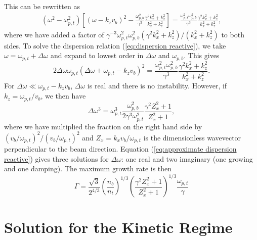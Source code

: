 \documentclass[usenatbib,iop,apj]{emulateapj}
\begin{document}
This can be rewritten as 
\begin{eqnarray}\label{eq:dispersion reactive}
 \left(\omega^2 - \omega_{p,t}^2\right)\left[\left(\omega - k_z v_b\right)^2 - \frac{\omega_{p,b}^2}{\gamma^3}\frac{\gamma^2 k_x^2 + k_z^2}{k_x^2 + k_z^2}\right] = \frac{\omega_{p,t}^2\omega_{p,b}^2}{\gamma^3}\frac{\gamma^2 k_x^2 + k_z^2}{k_x^2 + k_z^2},
\end{eqnarray}
where we have added a factor of $\gamma^{-3}\omega_{p,t}^2\omega_{p,b}^2({\gamma^2 k_x^2 + k_z^2})/({k_x^2 + k_z^2})$ to both sides. 
To solve the dispersion relation (\ref{eq:dispersion reactive}), we take $\omega = \omega_{p,t} + \Delta\omega$ and expand to lowest order in
$\Delta\omega$ and $\omega_{p,b}$.  This gives
\begin{equation}
 2\Delta\omega\omega_{p,t}\left(\Delta\omega + \omega_{p,t} - k_z v_b\right)^2 = \frac{\omega_{p,t}^2\omega_{p,b}^2}{\gamma^3}\frac{\gamma^2 k_x^2 + k_z^2}{k_x^2 + k_z^2}.
\end{equation}\label{eq:expanded dispersion reactive}
For $\Delta\omega \ll \omega_{p,t} - k_z v_b$, $\Delta\omega$ is real and there is no instability.  However, if $k_z = \omega_{p,t}/v_b$, we then have
\begin{equation}\label{eq:approximate dispersion reactive}
 \Delta\omega^3 = \omega_{p,t}^3\frac{\omega_{p,b}^2}{2\gamma^3\omega_{p,t}^2}\frac{\gamma^2 Z_x^2 + 1}{Z_x^2 + 1},
\end{equation}
where we have multiplied the fraction on the right hand side by $(v_b/\omega_{p,t})^2/(v_b/\omega_{p,t})^2$ and $Z_x = k_xv_b/\omega_{p,t}$ is the dimensionless wavevector perpendicular to the beam direction.  
Equation (\ref{eq:approximate dispersion reactive}) gives three solutions for $\Delta\omega$: one real and two imaginary (one growing and one damping).  The maximum growth rate is then
\begin{equation}\label{eq:growth rate reactive appendix}
 \Gamma = \frac{\sqrt{3}}{2^{4/3}}\left(\frac{n_b}{n_t}\right)^{1/3}\left(\frac{\gamma^2 Z_x^2 + 1}{Z_x^2 + 1}\right)^{1/3}\frac{\omega_{p,t}}{\gamma}
\end{equation}

\section{Solution for the Kinetic Regime}\label{sec:solution kinetic}
\end{document}
